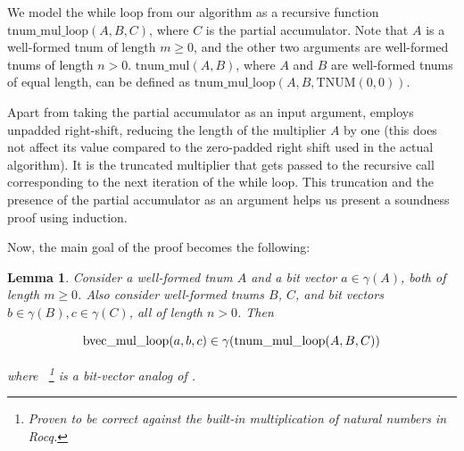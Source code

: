 \documentclass{article}
\newtheorem{lemma}{Lemma}
\newcommand{\ingamma}[2]{#1 \in \gamma(#2)}
\begin{document}
\newcommand{\tmulshrId}{\text{tnum\_mul\_loop}}
\newcommand{\tmulshr}[3]{$\tmulshrId{}(#1, #2, #3)$}
\newcommand{\tmulshrABC}{\tmulshr{A}{B}{C}}
\newcommand{\tmulshrABCp}{\tmulshr{A'}{B'}{C'}}
\newcommand{\tmulId}{\text{tnum\_mul}}
\newcommand{\tmulAB}{$\tmulId{}(A, B)$}

We model the while loop from our algorithm as a recursive function
\tmulshrABC{}, where $C$ is the partial accumulator. Note that $A$ is
a well-formed tnum of length $m \ge 0$, and the other two arguments
are well-formed tnums of length $n > 0$. \tmulAB{}, where $A$ and $B$
are well-formed tnums of equal length, can be defined as
\tmulshr{A}{B}{\text{TNUM}(0, 0)}.

Apart from taking the partial accumulator as an input argument,
\tmulshrId{} employs unpadded right-shift, reducing the length of the
multiplier $A$ by one (this does not affect its value compared to the
zero-padded right shift used in the actual algorithm). It is the
truncated multiplier that gets passed to the recursive call
corresponding to the next iteration of the while loop. This truncation
and the presence of the partial accumulator as an argument helps us
present a soundness proof using induction.

Now, the main goal of the proof becomes the following:

\begin{lemma}
  Consider a well-formed tnum $A$ and a bit vector $\ingamma{a}{A}$,
  both of length $m \ge 0$. Also consider well-formed tnums $B$, $C$,
  and bit vectors $\ingamma{b}{B}, \ingamma{c}{C}$, all of length $n >
  0$. Then

  \[
  \ingamma{\bmulshrId(a, b, c)}{\tmulshrId(A, B, C)}
  \]

  where \bmulshrId{}~\footnote{Proven to be correct against the
  built-in multiplication of natural numbers in Rocq.} is a bit-vector
  analog of \tmulshrId{}.
\end{lemma}
\end{document}
